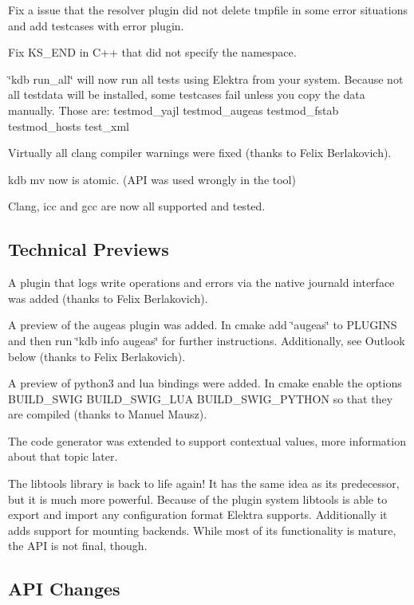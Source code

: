 Fix a issue that the resolver plugin did not delete tmpfile in some error situations and add testcases with error plugin.

Fix K\+S\+\_\+\+E\+ND in C++ that did not specify the namespace.

\char`\"{}kdb run\+\_\+all\char`\"{} will now run all tests using Elektra from your system. Because not all testdata will be installed, some testcases fail unless you copy the data manually. Those are\+: testmod\+\_\+yajl testmod\+\_\+augeas testmod\+\_\+fstab testmod\+\_\+hosts test\+\_\+xml

Virtually all clang compiler warnings were fixed (thanks to Felix Berlakovich).

kdb mv now is atomic. (A\+PI was used wrongly in the tool)

Clang, icc and gcc are now all supported and tested.

\subsection*{Technical Previews}

A plugin that logs write operations and errors via the native journald interface was added (thanks to Felix Berlakovich).

A preview of the augeas plugin was added. In cmake add \char`\"{}augeas\char`\"{} to P\+L\+U\+G\+I\+NS and then run \char`\"{}kdb info augeas\char`\"{} for further instructions. Additionally, see Outlook below (thanks to Felix Berlakovich).

A preview of python3 and lua bindings were added. In cmake enable the options B\+U\+I\+L\+D\+\_\+\+S\+W\+IG B\+U\+I\+L\+D\+\_\+\+S\+W\+I\+G\+\_\+\+L\+UA B\+U\+I\+L\+D\+\_\+\+S\+W\+I\+G\+\_\+\+P\+Y\+T\+H\+ON so that they are compiled (thanks to Manuel Mausz).

The code generator was extended to support contextual values, more information about that topic later.

The libtools library is back to life again! It has the same idea as its predecessor, but it is much more powerful. Because of the plugin system libtools is able to export and import any configuration format Elektra supports. Additionally it adds support for mounting backends. While most of its functionality is mature, the A\+PI is not final, though.

\subsection*{A\+PI Changes}

